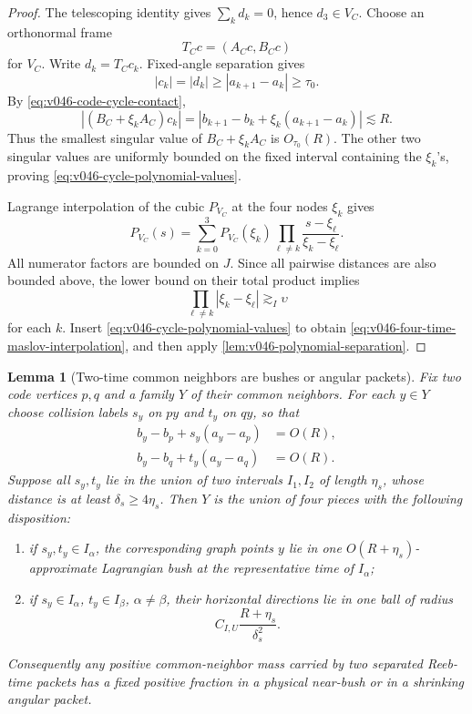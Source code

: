 \documentclass[10pt]{article}
\newtheorem{lemma}[theorem]{Lemma}
\begin{document}
\begin{proof}
The telescoping identity gives \(\sum_kd_k=0\), hence \(d_3\in V_C\).  Choose an orthonormal frame
\[
T_Cc=(A_Cc,B_Cc)
\]
for \(V_C\).  Write \(d_k=T_Cc_k\).  Fixed-angle separation gives
\[
|c_k|=|d_k|\ge|a_{k+1}-a_k|\ge\tau_0.
\]
By \eqref{eq:v046-code-cycle-contact},
\[
|(B_C+\xi_kA_C)c_k|
=
|b_{k+1}-b_k+\xi_k(a_{k+1}-a_k)|
\lesssim R.
\]
Thus the smallest singular value of \(B_C+\xi_kA_C\) is \(O_{\tau_0}(R)\).  The other two
singular values are uniformly bounded on the fixed interval containing the \(\xi_k\)'s, proving
\eqref{eq:v046-cycle-polynomial-values}.

Lagrange interpolation of the cubic \(P_{V_C}\) at the four nodes \(\xi_k\) gives
\[
P_{V_C}(s)
=
\sum_{k=0}^3
P_{V_C}(\xi_k)
\prod_{\ell\ne k}\frac{s-\xi_\ell}{\xi_k-\xi_\ell}.
\]
All numerator factors are bounded on \(J\).  Since all pairwise distances are also bounded above,
the lower bound on their total product implies
\[
\prod_{\ell\ne k}|\xi_k-\xi_\ell|
\gtrsim_I\upsilon
\]
for each \(k\).  Insert \eqref{eq:v046-cycle-polynomial-values} to obtain
\eqref{eq:v046-four-time-maslov-interpolation}, and then apply
\cref{lem:v046-polynomial-separation}.
\end{proof}

\begin{lemma}[Two-time common neighbors are bushes or angular packets]
\label{lem:v046-two-time-common-neighbors}
Fix two code vertices \(p,q\) and a family \(Y\) of their common neighbors.  For each \(y\in Y\)
choose collision labels \(s_y\) on \(py\) and \(t_y\) on \(qy\), so that
\[
\begin{aligned}
b_y-b_p+s_y(a_y-a_p)&=O(R),\\
b_y-b_q+t_y(a_y-a_q)&=O(R).
\end{aligned}
\]
Suppose all \(s_y,t_y\) lie in the union of two intervals \(I_1,I_2\) of length \(\eta_s\), whose
distance is at least \(\delta_s\ge4\eta_s\).  Then \(Y\) is the union of four pieces with the
following disposition:
\begin{enumerate}[label=\textnormal{(\roman*)}]
\item if \(s_y,t_y\in I_\alpha\), the corresponding graph points \(y\) lie in one
\(O(R+\eta_s)\)-approximate Lagrangian bush at the representative time of \(I_\alpha\);
\item if \(s_y\in I_\alpha\), \(t_y\in I_\beta\), \(\alpha\ne\beta\), their horizontal directions
lie in one ball of radius
\begin{equation}
\label{eq:v046-two-time-angular-radius}
\boxed{
C_{I,U}\frac{R+\eta_s}{\delta_s^2}.
}
\end{equation}
\end{enumerate}
Consequently any positive common-neighbor mass carried by two separated Reeb-time packets has a
fixed positive fraction in a physical near-bush or in a shrinking angular packet.
\end{lemma}
\end{document}
